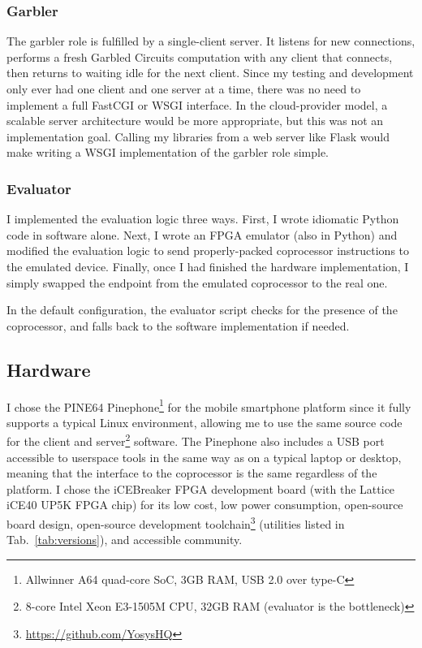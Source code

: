 \subsubsection{Garbler}
The garbler role is fulfilled by a single-client server. It listens for new connections, performs a fresh Garbled Circuits computation with any client that connects, then returns to waiting idle for the next client. Since my testing and development only ever had one client and one server at a time, there was no need to implement a full FastCGI or WSGI interface. In the cloud-provider model, a scalable server architecture would be more appropriate, but this was not an implementation goal. Calling my libraries from a web server like Flask would make writing a WSGI implementation of the garbler role simple.

\subsubsection{Evaluator}
I implemented the evaluation logic three ways. First, I wrote idiomatic Python code in software alone. Next, I wrote an FPGA emulator (also in Python) and modified the evaluation logic to send properly-packed coprocessor instructions to the emulated device. Finally, once I had finished the hardware implementation, I simply swapped the endpoint from the emulated coprocessor to the real one.

In the default configuration, the evaluator script checks for the presence of the coprocessor, and falls back to the software implementation if needed.

\subsection{Hardware}\label{sec:hw}
I chose the PINE64 Pinephone\cite{Pinephone}\footnote{Allwinner A64 quad-core SoC, 3GB RAM, USB 2.0 over type-C} for the mobile smartphone platform since it fully supports a typical Linux environment, allowing me to use the same source code for the client and server\footnote{8-core Intel Xeon E3-1505M CPU, 32GB RAM (evaluator is the bottleneck)} software. The Pinephone also includes a USB port accessible to userspace tools in the same way as on a typical laptop or desktop, meaning that the interface to the coprocessor is the same regardless of the platform. I chose the iCEBreaker FPGA development board\cite{iCEBreaker} (with the Lattice iCE40 UP5K FPGA chip\cite{LatticePage}) for its low cost, low power consumption, open-source board design, open-source development toolchain\footnote{\url{https://github.com/YosysHQ}} (utilities listed in Tab.~\ref{tab:versions}), and accessible community.

